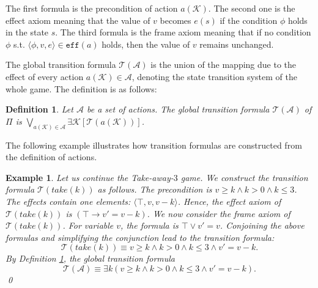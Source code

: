 \documentclass[review]{elsarticle}
\newcommand{\tuple}[1]{\langle {#1} \rangle}
\newcommand{\true}{\top}
\newcommand{\actparm}{\mathcal{K}}
\newcommand{\act}{\mathcal{A}}
\newcommand{\trans}{\mathcal{T}}
\newcommand{\eff}{\mathtt{eff}}
\newcommand{\con}{\phi}
\newtheorem{definition}{Definition}
\newtheorem{example}{Example}
\begin{document}
    The first formula is the precondition of action $a(\actparm)$.
    The second one is the effect axiom meaning that the value of $v$ becomes $e(s)$ if the condition $\con$ holds in the state $s$.
    The third formula is the frame axiom meaning that if no condition $\con$ s.t. $\tuple{\con, v, e} \in \eff(a)$ holds, then the value of $v$ remains unchanged. 
    
    The global transition formula $\trans(\act)$ is the union of the mapping due to the effect of every action $a(\actparm) \in \act$, denoting the state transition system of the whole game.
    The definition is as follows:
    
    \begin{definition}\label{def:globalTransForm} \rm
    	Let $\act$ be a set of actions.
    	The global transition formula $\trans(\act)$ of $\Pi$ is $\bigvee_{a(\actparm) \in \act} \exists \actparm [\trans(a(\actparm))]$.
    \end{definition}
    
    The following example illustrates how transition formulas are constructed from the definition of actions.
    \begin{example}\label{exm:transForm} %
    	Let us continue the Take-away-$3$ game.
    	We construct the transition formula $\trans(take(k))$ as follows.
    	The precondition is $v \geq k \land k > 0 \land k \leq 3$.
    	The effects contain one elements: $\tuple{\true, v, v - k}$.
    	Hence, the effect axiom of $\trans(take(k))$ is $(\true \rightarrow v' = v - k)$.
    	We now consider the frame axiom of $\trans(take(k))$.
    	For variable $v$, the formula is $\true \lor v' = v $.
    	Conjoining the above formulas and simplifying the conjunction lead to the transition formula: 
    	\[\trans(take(k)) \equiv v \geq k \land k > 0 \land k \leq 3 \land v' = v - k.\]
    	By Definition \ref{def:globalTransForm}, the global transition formula
    	\[\trans(\act) \equiv \exists k (v \geq k \land k > 0 \land k \leq 3 \land v' = v - k).\]  	\qed
    \end{example}
    
	
\end{document}
